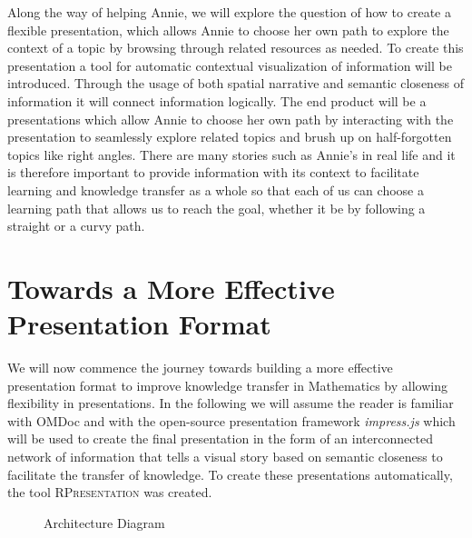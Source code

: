 \documentclass{llncs}
\newcommand{\sys}{\textsc{RPresentation}\xspace}
\begin{document}
Along the way of helping Annie, we will explore the question of how to create a flexible presentation, which allows Annie to choose her own path to explore the context of a topic by browsing through related resources as needed. To create this presentation a tool for automatic contextual visualization of information will be introduced. Through the usage of both spatial narrative and semantic closeness of information it will connect information logically. The end product will be a presentations which allow Annie to choose her own path by interacting with the presentation to seamlessly explore related topics and brush up on half-forgotten topics like right angles. There are many stories such as Annie's in real life and it is therefore important to provide information with its context to facilitate learning and knowledge transfer as a whole so that each of us can choose a learning path that allows us to reach the goal, whether it be by following a straight or a curvy path.

\section{Towards a More Effective Presentation Format}
\label{sec:TowardsAMoreEffectivePresentationFormat}

We will now commence the journey towards building a more effective presentation format to improve knowledge transfer in Mathematics by allowing flexibility in presentations. In the following we will assume the reader is familiar with OMDoc \cite{Kohlhase:OMDoc1.2} and with the open-source presentation framework \textit{impress.js} \cite{JSImpress:npentrel14} which will be used to create the final presentation in the form of an interconnected network of information that tells a visual story based on semantic closeness to facilitate the transfer of knowledge. To create these presentations automatically, the tool \sys \cite{npentrel:npentrel15} was created. 

\begin{figure}\centering\vspace{-2em}
  \vspace{-1.7em}
  \caption{Architecture Diagram}\label{fig:architecture}
  \vspace{-1.5em}
\end{figure}
\end{document}
